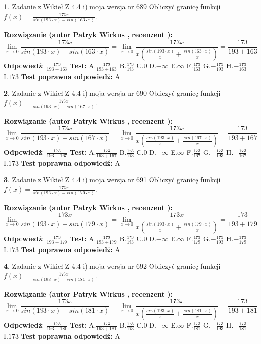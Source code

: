 \documentclass[12pt, a4paper]{article}
\theoremstyle{definition} %
\newtheorem{zad}{}
\newcommand{\zadStart}[1]{\begin{zad}#1\newline}
\newcommand{\zadStop}{\end{zad}}
\newcommand{\rozwStart}[2]{\noindent \textbf{Rozwiązanie (autor #1 , recenzent #2): }\newline}
\newcommand{\rozwStop}{\newline}
\newcommand{\odpStart}{\noindent \textbf{Odpowiedź:}\newline}
\newcommand{\odpStop}{\newline}
\newcommand{\testStart}{\noindent \textbf{Test:}\newline}
\newcommand{\testStop}{\newline}
\newcommand{\kluczStart}{\noindent \textbf{Test poprawna odpowiedź:}\newline}
\newcommand{\kluczStop}{\newline}
\begin{document}
\zadStart{Zadanie z Wikieł Z 4.4 i) moja wersja nr 689}
Obliczyć granicę funkcji $f(x)=\frac{173x}{sin(193\cdot x) +sin(163\cdot x)}$.
\zadStop
\rozwStart{Patryk Wirkus}{}
$$\lim\limits_{x\to 0}\frac{173x}{sin(193\cdot x) +sin(163\cdot x)}=\lim\limits_{x\to 0}\frac{173x}{x(\frac{sin(193\cdot x)}{x}+\frac{sin(163\cdot x)}{x})}=\frac{173}{193+163}$$
\rozwStop
\odpStart
$\frac{173}{193+163}$
\odpStop
\testStart
A.$\frac{173}{193+163}$
B.$\frac{173}{193}$
C.$0$
D.$-\infty$
E.$\infty$
F.$\frac{173}{163}$
G.$-\frac{173}{193}$
H.$-\frac{173}{163}$
I.$173$
\testStop
\kluczStart
A
\kluczStop



\zadStart{Zadanie z Wikieł Z 4.4 i) moja wersja nr 690}
Obliczyć granicę funkcji $f(x)=\frac{173x}{sin(193\cdot x) +sin(167\cdot x)}$.
\zadStop
\rozwStart{Patryk Wirkus}{}
$$\lim\limits_{x\to 0}\frac{173x}{sin(193\cdot x) +sin(167\cdot x)}=\lim\limits_{x\to 0}\frac{173x}{x(\frac{sin(193\cdot x)}{x}+\frac{sin(167\cdot x)}{x})}=\frac{173}{193+167}$$
\rozwStop
\odpStart
$\frac{173}{193+167}$
\odpStop
\testStart
A.$\frac{173}{193+167}$
B.$\frac{173}{193}$
C.$0$
D.$-\infty$
E.$\infty$
F.$\frac{173}{167}$
G.$-\frac{173}{193}$
H.$-\frac{173}{167}$
I.$173$
\testStop
\kluczStart
A
\kluczStop



\zadStart{Zadanie z Wikieł Z 4.4 i) moja wersja nr 691}
Obliczyć granicę funkcji $f(x)=\frac{173x}{sin(193\cdot x) +sin(179\cdot x)}$.
\zadStop
\rozwStart{Patryk Wirkus}{}
$$\lim\limits_{x\to 0}\frac{173x}{sin(193\cdot x) +sin(179\cdot x)}=\lim\limits_{x\to 0}\frac{173x}{x(\frac{sin(193\cdot x)}{x}+\frac{sin(179\cdot x)}{x})}=\frac{173}{193+179}$$
\rozwStop
\odpStart
$\frac{173}{193+179}$
\odpStop
\testStart
A.$\frac{173}{193+179}$
B.$\frac{173}{193}$
C.$0$
D.$-\infty$
E.$\infty$
F.$\frac{173}{179}$
G.$-\frac{173}{193}$
H.$-\frac{173}{179}$
I.$173$
\testStop
\kluczStart
A
\kluczStop



\zadStart{Zadanie z Wikieł Z 4.4 i) moja wersja nr 692}
Obliczyć granicę funkcji $f(x)=\frac{173x}{sin(193\cdot x) +sin(181\cdot x)}$.
\zadStop
\rozwStart{Patryk Wirkus}{}
$$\lim\limits_{x\to 0}\frac{173x}{sin(193\cdot x) +sin(181\cdot x)}=\lim\limits_{x\to 0}\frac{173x}{x(\frac{sin(193\cdot x)}{x}+\frac{sin(181\cdot x)}{x})}=\frac{173}{193+181}$$
\rozwStop
\odpStart
$\frac{173}{193+181}$
\odpStop
\testStart
A.$\frac{173}{193+181}$
B.$\frac{173}{193}$
C.$0$
D.$-\infty$
E.$\infty$
F.$\frac{173}{181}$
G.$-\frac{173}{193}$
H.$-\frac{173}{181}$
I.$173$
\testStop
\kluczStart
A
\kluczStop
\end{document}
